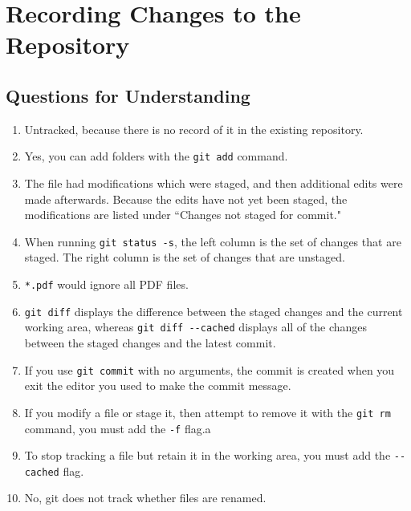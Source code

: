 \section{Recording Changes to the Repository}

\subsection{Questions for Understanding}
\begin{enumerate}
    \item Untracked, because there is no record of it in the existing
        repository.
    \item Yes, you can add folders with the \verb+git add+ command.
    \item The file had modifications which were staged, and then additional
        edits were made afterwards. Because the edits have not yet been
        staged, the modifications are listed under ``Changes not staged for
        commit."
    \item When running \verb+git status -s+, the left column is the set of
        changes that are staged. The right column is the set of changes that
        are unstaged.
    \item \verb+*.pdf+ would ignore all PDF files.
    \item \verb+git diff+ displays the difference between the staged changes
        and the current working area, whereas \verb+git diff --cached+
        displays all of the changes between the staged changes and the
        latest commit.
    \item If you use \verb+git commit+ with no arguments, the commit is
        created when you exit the editor you used to make the commit
        message.
    \item If you modify a file or stage it, then attempt to remove it with
        the \verb+git rm+ command, you must add the \verb+-f+ flag.a
    \item To stop tracking a file but retain it in the working area, you
        must add the \verb+--cached+ flag.
    \item No, git does not track whether files are renamed.
\end{enumerate}

